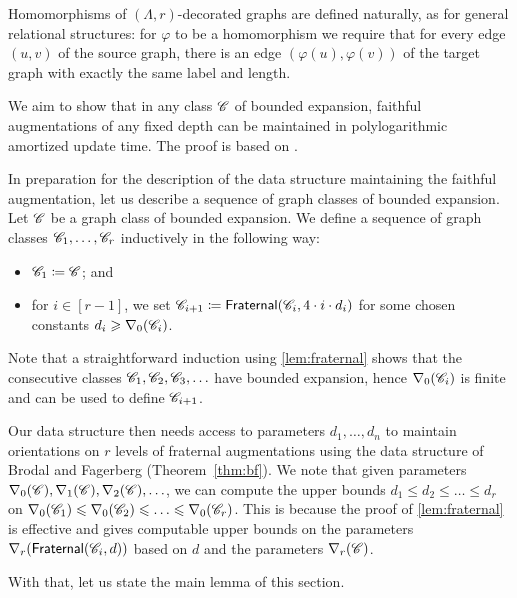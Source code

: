 Homomorphisms of $(\Lambda,r)$-decorated graphs are defined naturally, as for general relational structures: for $\varphi$ to be a homomorphism we require that for every edge $(u,v)$ of the source graph, there is an edge $(\varphi(u),\varphi(v))$ of the target graph with exactly the same label and length.

We aim to show that in any class $\mathscr C$ of bounded expansion, faithful augmentations of any fixed depth can be maintained in polylogarithmic amortized update time. The proof is based on \cite[Theorem 4]{DvorakTumaArxiv}.

In preparation for the description of the data structure maintaining the faithful augmentation, let us describe a sequence of graph classes of bounded expansion. Let $\mathscr C$ be a graph class of bounded expansion. We define a sequence of graph classes $\mathscr C_1, \ldots, \mathscr C_r$ inductively in the following way:
\begin{itemize}
	\item $\mathscr C_1 \coloneqq \mathscr C$; and
	\item for $i\in [r-1]$, we set $\mathscr C_{i+1} \coloneqq \mathsf{Fraternal}(\mathscr C_i, 4 \cdot i \cdot d_i)$ for some chosen constants $d_i \geqslant \nabla_0(\mathscr C_i)$.
\end{itemize}
Note that a straightforward induction using \cref{lem:fraternal} shows that the consecutive classes $\mathscr C_1,\mathscr C_2,\mathscr C_3,\ldots$ have bounded expansion, hence $\nabla_0(\mathscr C_i)$ is finite and can be used to define $\mathscr C_{i+1}$.

Our data structure then needs access to parameters $d_1,\ldots , d_n$
to maintain orientations on $r$ levels of fraternal augmentations using
the data structure of Brodal and Fagerberg (Theorem~\ref{thm:bf}).
We note that given parameters
$\nabla_0(\mathscr C),\nabla_1(\mathscr C),\nabla_2(\mathscr C),\ldots$, we can compute the
upper bounds $d_1\le d_2\leq \ldots\le d_r$ on
$\nabla_0(\mathscr C_1)\leqslant \nabla_0(\mathscr C_2)\leqslant \ldots \leqslant \nabla_0(\mathscr C_r)$.
This is because
the proof of \cref{lem:fraternal} is effective and
gives computable upper bounds on the parameters $\nabla_r(\mathsf{Fraternal}(\mathscr C_i,d))$ based on $d$ and the parameters $\nabla_r(\mathscr C)$.

With that, let us state the main lemma of this section.


